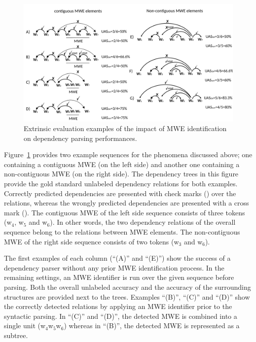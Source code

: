 \documentclass[output=paper]{LSP/langsci}
\begin{document}
\begin{figure}[htbp]
  \centering
      \includegraphics[width=1.00\textwidth]{figures/Presentation1}%
    \caption{Extrinsic evaluation examples of the impact of MWE identification on dependency parsing performances.}
	\label{fig:example}
\end{figure}


Figure~\ref{fig:example} provides two example sequences for the phenomena discussed above; one containing a contiguous MWE (on the left side)  and another one containing a non-contiguous MWE (on the right side).
The dependency trees in this figure provide the gold standard unlabeled dependency relations for both examples.
Correctly predicted dependencies %
are presented with check marks (\checkmark) over the relations, whereas the wrongly predicted dependencies are presented with a cross mark (). 
The contiguous MWE of the left side sequence consists of three tokens (w$_4$, w$_5$ and w$_6$). In other words, the two dependency relations of the overall sequence belong to the relations between MWE elements. The non-contiguous MWE of the right side sequence consists of two tokens (w$_3$ and w$_6$).

The first examples of each column (``(A)'' and ``(E)'') show the success of a dependency parser without any prior MWE identification process. 
In the remaining settings, an MWE identifier is run over the given sequence before parsing.
Both the overall unlabeled accuracy \asuo{} and the accuracy of the surrounding structures \asus{} are provided next to the trees. Examples ``(B)'', ``(C)'' and ``(D)'' show the correctly detected relations by applying an MWE identifier prior to the syntactic parsing. In ``(C)'' and ``(D)'', the detected MWE is combined into a single unit (w$_4$w$_5$w$_6$) whereas in ``(B)'', the detected MWE is represented as a subtree. %
\end{document}
